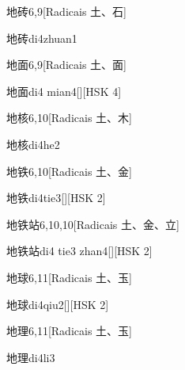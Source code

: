 \begin{entry}{地砖}{6,9}[Radicais ⼟、⽯]
  \begin{phonetics}{地砖}{di4zhuan1}
  \end{phonetics}
\end{entry}

\begin{entry}{地面}{6,9}[Radicais ⼟、⾯]
  \begin{phonetics}{地面}{di4 mian4}[][HSK 4]
  \end{phonetics}
\end{entry}

\begin{entry}{地核}{6,10}[Radicais ⼟、⽊]
  \begin{phonetics}{地核}{di4he2}
  \end{phonetics}
\end{entry}

\begin{entry}{地铁}{6,10}[Radicais ⼟、⾦]
  \begin{phonetics}{地铁}{di4tie3}[][HSK 2]
  \end{phonetics}
\end{entry}

\begin{entry}{地铁站}{6,10,10}[Radicais ⼟、⾦、⽴]
  \begin{phonetics}{地铁站}{di4 tie3 zhan4}[][HSK 2]
  \end{phonetics}
\end{entry}

\begin{entry}{地球}{6,11}[Radicais ⼟、⽟]
  \begin{phonetics}{地球}{di4qiu2}[][HSK 2]
  \end{phonetics}
\end{entry}

\begin{entry}{地理}{6,11}[Radicais ⼟、⽟]
  \begin{phonetics}{地理}{di4li3}
  \end{phonetics}
\end{entry}

